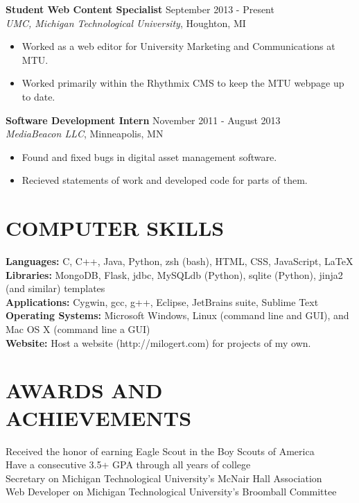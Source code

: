 \documentclass[line,margin]{res}
\begin{document}
\begin{resume}
\begin{itemize}
\end{itemize}

{\bf Student Web Content Specialist} \hfill September 2013 - Present \\
{\sl UMC, Michigan Technological University}, Houghton, MI
\begin{itemize}

  \itemsep -2pt %

  \item Worked as a web editor for University Marketing and Communications at MTU.
  \item Worked primarily within the Rhythmix CMS to keep the MTU webpage up to date.

\end{itemize}

{\bf Software Development Intern} \hfill November 2011 - August 2013 \\
{\sl MediaBeacon LLC}, Minneapolis, MN
\begin{itemize}

  \itemsep -2pt %

  \item Found and fixed bugs in digital asset management software.
  \item Recieved statements of work and developed code for parts of them.

\end{itemize}


\section{COMPUTER SKILLS}

{\bf Languages:} C, C++, Java, Python, zsh (bash), HTML, CSS, JavaScript, LaTeX \\
{\bf Libraries:} MongoDB, Flask, jdbc, MySQLdb (Python), sqlite (Python), jinja2 (and similar) templates \\
{\bf Applications:} Cygwin, gcc, g++, Eclipse, JetBrains suite, Sublime Text \\
{\bf Operating Systems:} Microsoft Windows, Linux (command line and GUI), and Mac OS X (command line a GUI) \\
{\bf Website:} Host a website (http://milogert.com) for projects of my own.


\section{AWARDS AND ACHIEVEMENTS}

Received the honor of earning Eagle Scout in the Boy Scouts of America \\
Have a consecutive 3.5+ GPA through all years of college \\
Secretary on Michigan Technological University’s McNair Hall Association \\
Web Developer on Michigan Technological University’s Broomball Committee

\end{resume}
\end{document}
